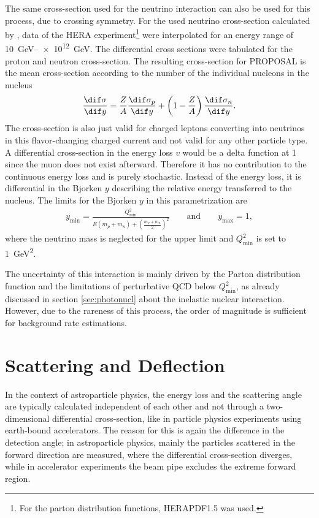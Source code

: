 The same cross-section used for the neutrino interaction can also be used for this process, due to crossing symmetry.
For the used neutrino cross-section calculated by \cite{CSMS11NuXsection}, data of the HERA experiment\footnote{For the parton distribution functions, HERAPDF1.5 \cite{Aaron09herapdf10, CooperSarkar10herapdf15} was used.} were interpolated for an energy range of \SIrange{10}{e12}{GeV}.
The differential cross sections were tabulated for the proton and neutron cross-section.
The resulting cross-section for PROPOSAL is the mean cross-section according to the number of the individual nucleons in the nucleus
\begin{align}
    \frac{\dif \sigma}{\dif y} = \frac{Z}{A} \frac{\dif \sigma_p}{\dif y} + \left(1 - \frac{Z}{A} \right) \frac{\dif \sigma_n}{\dif y} .
\end{align}
The cross-section is also just valid for charged leptons converting into neutrinos in this flavor-changing charged current and not valid for any other particle type.
A differential cross-section in the energy loss $v$ would be a delta function at \num{1} since the muon does not exist afterward.
Therefore it has no contribution to the continuous energy loss and is purely stochastic.
Instead of the energy loss, it is differential in the Bjorken $y$ describing the relative energy transferred to the nucleus.
The limits for the Bjorken $y$ in this parametrization are
\begin{align}
    y_{\text{min}} = \frac{Q_{\text{min}}^2}{E (m_p + m_n) + \left( \frac{m_p + m_n}{2} \right)^2}
    \qquad \text{and} \qquad
    y_{\text{max}} = 1 ,
\end{align}
where the neutrino mass is neglected for the upper limit and $Q_{\text{min}}^2$ is set to \SI{1}{GeV^2}.

The uncertainty of this interaction is mainly driven by the Parton distribution function and the limitations of perturbative QCD below $Q_{\text{min}}^2$, as already discussed in section \ref{sec:photonucl} about the inelastic nuclear interaction.
However, due to the rareness of this process, the order of magnitude is sufficient for background rate estimations.

%

\section{Scattering and Deflection}

In the context of astroparticle physics, the energy loss and the scattering angle are typically calculated independent of each other and not through a two-dimensional differential cross-section, like in particle physics experiments using earth-bound accelerators.
The reason for this is again the difference in the detection angle;
in astroparticle physics, mainly the particles scattered in the forward direction are measured, where the differential cross-section diverges, while in accelerator experiments the beam pipe excludes the extreme forward region.


